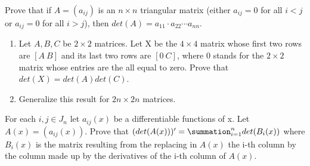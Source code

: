 \documentclass[12pt,letterpaper,cm]{hmcpset}
\begin{document}
\begin{solution}

\end{solution}

\pagebreak

\begin{problem}[A3]
    Prove that if $A=(a_{ij})$ is an $n \times n$ triangular matrix (either $a_{ij} = 0$ for all $i<j$ or $a_{ij}=0$ for all $i>j$), then $det(A) = a_{11}\cdot a_{22} \cdots a_{nn}$.
\end{problem}

\begin{solution}
    
\end{solution}

\pagebreak

\begin{problem}[A4]
    \begin{enumerate}
        \item Let $A,B,C$ be $2\times 2$ matrices. Let X be the $4\times 4$ matrix whose first two rows are $[A\ B]$ and its last two rows are $[0\ C]$, where 0 stands for the $2\times 2$ matrix whose entries are the all equal to zero. Prove that $det(X) = det(A)det(C)$.
        \item Generalize this result for $2n \times 2n$ matrices.
    \end{enumerate}
\end{problem}
\begin{solution}

\end{solution}
\pagebreak

\begin{problem}[A5]
    For each $i,j\in J_n$ let $a_{ij}(x)$ be a differentiable functions of x. Let $A(x) = (a_{ij}(x))$. Prove that $(det(A(x)))' = \summation_{i=1}^n det(B_i(x))$ where $B_i(x)$ is the matrix resulting from the replacing in $A(x)$ the i-th column by the column made up by the derivatives of the i-th column of $A(x)$. 
\end{problem}

\begin{solution}
    
\end{solution}
\end{document}
